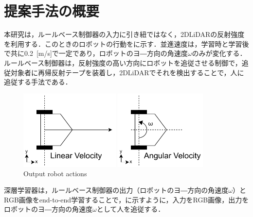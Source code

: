 
\section{提案手法の概要}

  本研究は，ルールベース制御器の入力に引き紐ではなく，2DLiDARの反射強度を利用する．このときのロボットの行動をに示す．並進速度は，学習時と学習後で共に0.2 \,[m/s]で一定であり，ロボットのヨ―方向の角速度$\omega$のみが変化する．ルールベース制御器は，反射強度の高い方向にロボットを追従させる制御で，追従対象者に再帰反射テープを装着し，2DLiDARでそれを検出することで，人に追従する手法である．

  \vspace{0.5cm}

  \begin{figure}[h]
    \centering
    \begin{minipage}[c]{65mm} 
        \centering
        \includegraphics[height=40mm]{images/pdf/RobotGuidance_linear_velocity}
    \end{minipage}
    \begin{minipage}[c]{65mm} 
        \centering
        \includegraphics[height=40mm]{images/pdf/RobotGuidance_angular_velocity}
    \end{minipage}
    \caption{Output robot actions}
    \label{Fig:RobotGuidance_velocity}
  \end{figure}

\newpage

  深層学習器は，ルールベース制御器の出力（ロボットのヨ―方向の角速度$\omega$）とRGB画像をend-to-end学習することで，に示すように，入力をRGB画像，出力をロボットのヨ―方向の角速度$\omega$として人を追従する．


